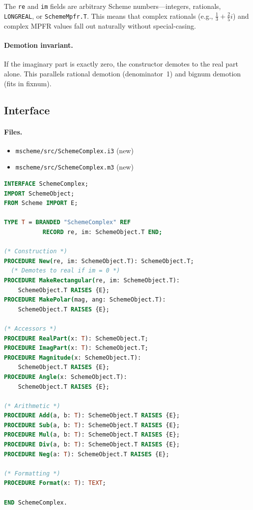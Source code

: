 \documentclass[12pt]{article}
\begin{document}
\noindent The {\tt re} and {\tt im} fields are arbitrary Scheme
numbers---integers, rationals, {\tt LONGREAL}, or {\tt SchemeMpfr.T}.
This means that complex rationals (e.g., $\frac{1}{3} + \frac{2}{5}i$)
and complex MPFR values fall out naturally without special-casing.

\paragraph{Demotion invariant.}
If the imaginary part is exactly zero, the constructor demotes
to the real part alone.  This parallels rational demotion
(denominator~1) and bignum demotion (fits in fixnum).

\subsection{Interface}

\paragraph{Files.}
\begin{itemize}[nosep]
\item {\tt mscheme/src/SchemeComplex.i3} (new)
\item {\tt mscheme/src/SchemeComplex.m3} (new)
\end{itemize}

\begin{lstlisting}[language=Modula3]
INTERFACE SchemeComplex;
IMPORT SchemeObject;
FROM Scheme IMPORT E;

TYPE T = BRANDED "SchemeComplex" REF
           RECORD re, im: SchemeObject.T END;

(* Construction *)
PROCEDURE New(re, im: SchemeObject.T): SchemeObject.T;
  (* Demotes to real if im = 0 *)
PROCEDURE MakeRectangular(re, im: SchemeObject.T):
    SchemeObject.T RAISES {E};
PROCEDURE MakePolar(mag, ang: SchemeObject.T):
    SchemeObject.T RAISES {E};

(* Accessors *)
PROCEDURE RealPart(x: T): SchemeObject.T;
PROCEDURE ImagPart(x: T): SchemeObject.T;
PROCEDURE Magnitude(x: SchemeObject.T):
    SchemeObject.T RAISES {E};
PROCEDURE Angle(x: SchemeObject.T):
    SchemeObject.T RAISES {E};

(* Arithmetic *)
PROCEDURE Add(a, b: T): SchemeObject.T RAISES {E};
PROCEDURE Sub(a, b: T): SchemeObject.T RAISES {E};
PROCEDURE Mul(a, b: T): SchemeObject.T RAISES {E};
PROCEDURE Div(a, b: T): SchemeObject.T RAISES {E};
PROCEDURE Neg(a: T): SchemeObject.T RAISES {E};

(* Formatting *)
PROCEDURE Format(x: T): TEXT;

END SchemeComplex.
\end{lstlisting}
\end{document}
